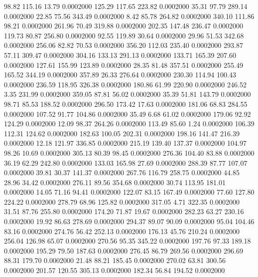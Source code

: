  98.82  115.16   13.79   0.0002000
 125.29  117.65  223.82   0.0002000
  35.31   97.79  289.14   0.0002000
  22.85   75.56  343.49   0.0002000
   8.42   85.78  264.82   0.0002000
 340.10  111.86   98.21   0.0002000
 261.96   70.49  319.88   0.0002000
 202.35  147.48  236.47   0.0002000
 119.73   80.87  256.80   0.0002000
  92.55  119.89   30.64   0.0002000
  29.96   51.53  342.68   0.0002000
 256.06   82.82   70.53   0.0002000
 356.20  112.03  235.40   0.0002000
 293.87   57.11  309.47   0.0002000
 304.16  133.13  291.13   0.0002000
 133.71  165.39  207.60   0.0002000
 127.61  155.99  123.89   0.0002000
  28.35   81.48  357.51   0.0002000
 255.49  165.52  344.19   0.0002000
 357.89   26.33  276.64   0.0002000
 230.30  114.94  100.43   0.0002000
 236.59  118.95  326.38   0.0002000
 180.86   61.99  220.90   0.0002000
 246.52    3.35  231.99   0.0002000
 359.05   87.81   56.02   0.0002000
  35.39   51.81  143.79   0.0002000
  98.71   85.53  188.52   0.0002000
 296.50  173.42   17.63   0.0002000
 181.06   68.83  284.55   0.0002000
 107.52   91.77  104.86   0.0002000
  35.49    6.68   61.02   0.0002000
 179.06   92.92  124.29   0.0002000
  12.09   98.37  264.26   0.0002000
 113.49   85.60    1.24   0.0002000
 106.39  112.31  124.62   0.0002000
 182.63  100.05  202.31   0.0002000
 198.16  141.47  216.39   0.0002000
  12.18  121.97  336.85   0.0002000
 215.19  139.40  137.37   0.0002000
 104.97   98.26   10.69   0.0002000
 305.13   80.39   98.45   0.0002000
 276.36  104.40   83.88   0.0002000
  36.19   62.29  242.80   0.0002000
 133.03  165.98   27.69   0.0002000
 288.39   87.77  107.07   0.0002000
  39.81   30.37  141.37   0.0002000
 267.76  116.79  258.75   0.0002000
  44.85   28.96   34.42   0.0002000
 276.11   89.56  354.68   0.0002000
  30.74  113.95  181.01   0.0002000
  14.05   71.16   94.41   0.0002000
 122.07   83.15  167.49   0.0002000
  77.60  127.80  224.22   0.0002000
 278.79   68.96  125.82   0.0002000
 317.05    4.71  322.35   0.0002000
  31.51   87.76  255.80   0.0002000
 174.20   71.87   19.67   0.0002000
 282.23   63.27  230.16   0.0002000
  19.92   86.63  278.69   0.0002000
 294.37   89.07   90.09   0.0002000
  95.04  104.46   83.16   0.0002000
 274.76   56.42  252.13   0.0002000
 176.13   45.76  210.24   0.0002000
 256.04  126.98   65.07   0.0002000
 270.56   95.35  345.22   0.0002000
 197.76   97.33  189.18   0.0002000
 195.29   79.50  187.63   0.0002000
 276.45   86.79  269.56   0.0002000
 296.69   88.31  179.70   0.0002000
  21.48   88.21  185.45   0.0002000
 270.02   63.81  300.56   0.0002000
 201.57  120.55  305.13   0.0002000
 182.34   56.84  194.52   0.0002000
